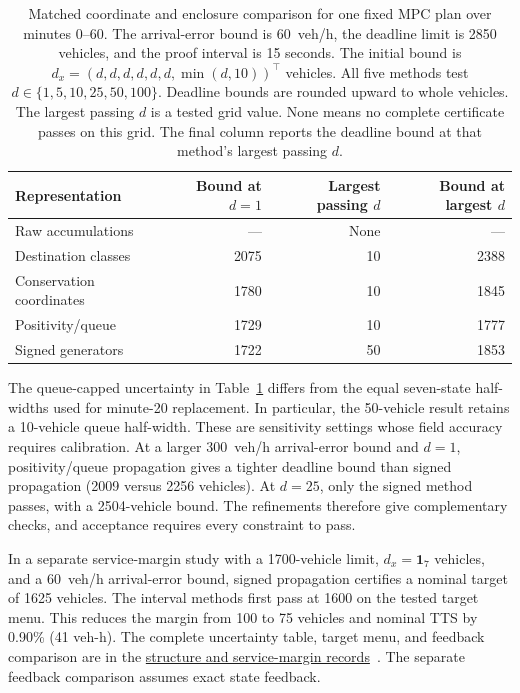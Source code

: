 \documentclass[preprint,12pt]{elsarticle}
\theoremstyle{definition}
\theoremstyle{plain}
\theoremstyle{definition}
\theoremstyle{plain}
\newcommand{\reproductiondetails}[1]{\href{https://github.com/AlienEslami/agentic-perimeter-runtime-certification/releases/tag/paper-2026-11-10}{#1}~\cite{perimeterReproductionGuide}}
\begin{document}
\begin{table}[!htbp]
\centering\small
\setlength{\belowcaptionskip}{6pt}
\caption{Matched coordinate and enclosure comparison for one fixed MPC
plan over minutes 0--60. The arrival-error bound is 60~veh/h, the
deadline limit is 2850 vehicles, and the proof interval is 15 seconds.
The initial bound is
$d_x=(d,d,d,d,d,d,\min(d,10))^\top$ vehicles. All five methods test
$d\in\{1,5,10,25,50,100\}$. Deadline bounds are rounded upward to whole
vehicles. The largest passing $d$ is a tested grid value. None means no
complete certificate passes on this grid. The final column reports the
deadline bound at that method's largest passing $d$.}
\label{tab:coordinate-comparison}
\setlength{\tabcolsep}{4pt}
\begin{tabular}{@{}lrrr@{}}
\toprule
Representation & \shortstack{Bound at\\$d=1$} & \shortstack{Largest\\passing $d$} & \shortstack{Bound at\\largest $d$}\\
\midrule
Raw accumulations & --- & None & ---\\
Destination classes & 2075 & 10 & 2388\\
Conservation coordinates & 1780 & 10 & 1845\\
Positivity/queue & 1729 & 10 & 1777\\
Signed generators & 1722 & 50 & 1853\\
\bottomrule
\end{tabular}
\end{table}

The queue-capped uncertainty in Table~\ref{tab:coordinate-comparison}
differs from the equal seven-state half-widths used for minute-20
replacement. In particular, the 50-vehicle result retains a 10-vehicle
queue half-width. These are sensitivity settings whose field accuracy
requires calibration. At a larger 300~veh/h arrival-error bound and $d=1$,
positivity/queue propagation gives a tighter deadline bound than signed
propagation (2009 versus 2256 vehicles). At $d=25$, only the signed
method passes, with a 2504-vehicle bound. The refinements therefore give
complementary checks, and acceptance requires every constraint to pass.

In a separate service-margin study with a 1700-vehicle limit,
$d_x=\mathbf1_7$ vehicles, and a 60~veh/h arrival-error bound, signed
propagation certifies a nominal target of 1625 vehicles. The interval
methods first pass at 1600 on the tested target menu. This reduces the
margin from 100 to 75 vehicles and nominal TTS by 0.90\% (41 veh-h).
The complete uncertainty table, target menu, and feedback comparison
are in the \reproductiondetails{structure and service-margin records}.
The separate feedback comparison assumes exact state feedback.
\end{document}
